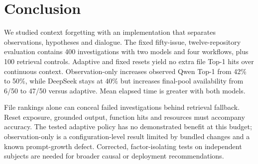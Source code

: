 \section{Conclusion}\label{sec:conclusion}
We studied context forgetting with an implementation that separates observations, hypotheses and dialogue. The fixed fifty-issue, twelve-repository evaluation contains 400 investigations with two models and four workflows, plus 100 retrieval controls. Adaptive and fixed resets yield no extra file Top-1 hits over continuous context. Observation-only increases observed Qwen Top-1 from 42\% to 50\%, while DeepSeek stays at 40\% but increases final-pool availability from 6/50 to 47/50 versus adaptive. Mean elapsed time is greater with both models.

File rankings alone can conceal failed investigations behind retrieval fallback. Reset exposure, grounded output, function hits and resources must accompany accuracy. The tested adaptive policy has no demonstrated benefit at this budget; observation-only is a configuration-level result limited by bundled changes and a known prompt-growth defect. Corrected, factor-isolating tests on independent subjects are needed for broader causal or deployment recommendations.

